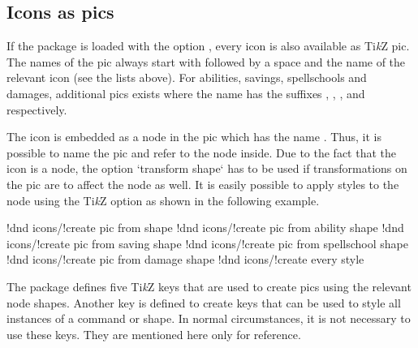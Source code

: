 \documentclass[a4paper]{article}
\begin{document}
\begin{codeexample}
\end{codeexample}

\subsection{Icons as pics}\label{sec:pics}

If the package is loaded with the option , every icon is also available as Ti\emph{k}Z pic. The names of the pic always start with  followed by a space and the name of the relevant icon (see the lists above). For abilities, savings, spellschools and damages, additional pics exists where the name has the suffixes , , , and  respectively.

The icon is embedded as a node in the pic which has the name . Thus, it is possible to name the pic and refer to the node inside. Due to the fact that the icon is a node, the option `transform shape` has to be used if transformations on the pic are to affect the node as well. It is easily possible to apply styles to the node using the Ti\emph{k}Z option  as shown in the following example.

\begin{codeexample}
\end{codeexample}

\begin{macrodef}
!dnd icons/!create pic from shape
!dnd icons/!create pic from ability shape
!dnd icons/!create pic from saving shape 
!dnd icons/!create pic from spellschool shape
!dnd icons/!create pic from damage shape
!dnd icons/!create every style
\end{macrodef}
The package defines five Ti\emph{k}Z keys that are used to create pics using the relevant node shapes. Another key is defined to create keys that can be used to style all instances of a command or shape. In normal circumstances, it is not necessary to use these keys. They are mentioned here only for reference. 
\end{document}

